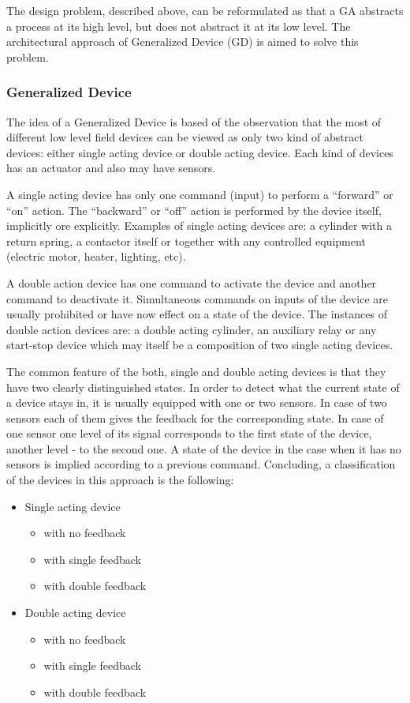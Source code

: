 The design problem, described above, can be reformulated as that a GA abstracts
a process at its high level, but does not abstract it at its low level. The
architectural approach of Generalized Device (GD) is aimed to solve this
problem.

\subsubsection{Generalized Device}

The idea of a Generalized Device is based of the observation that the most
of different low level field devices can be viewed as only two kind of abstract
devices: either single acting device or double acting device. Each kind
of devices has an actuator and also may have sensors.

A single acting device has only one command (input) to perform a ``forward'' or
``on'' action. The ``backward'' or ``off'' action is performed by the device
itself, implicitly ore explicitly. Examples of single acting devices are:
a cylinder with a return spring, a contactor itself or together with any
controlled equipment (electric motor, heater, lighting, etc).

A double action device has one command to activate the device and another
command to deactivate it. Simultaneous commands on inputs of the device are
usually prohibited or have now effect on a state of the device. The instances of
double action devices are: a double acting cylinder, an auxiliary relay or any
start-stop device which may itself be a composition of two single acting
devices.

The common feature of the both, single and double acting devices is that they
have two clearly distinguished states. In order to detect what the current state
of a device stays in, it is usually equipped with one or two sensors. In case of
two sensors each of them gives the feedback for the corresponding state. In case
of one sensor one level of its signal corresponds to the first state of the
device, another level - to the second one. A state of the device in the case
when it has no sensors is implied according to a previous command. Concluding,
a classification of the devices in this approach is the following:

\begin{itemize}
  \item Single acting device
	\begin{itemize}
	  \item with no feedback
	  \item with single feedback
	  \item with double feedback
	\end{itemize} 
  \item Double acting device
	\begin{itemize}
	  \item with no feedback
	  \item with single feedback
	  \item with double feedback
	\end{itemize} 
\end{itemize} 


